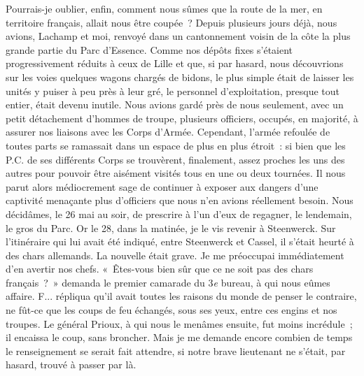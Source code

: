 \documentclass[french,twoside]{book} %
\begin{document}
Pourrais-je oublier, enfin, comment nous sûmes que la route de la mer, en territoire français, allait nous être coupée ? Depuis plusieurs jours déjà, nous avions, Lachamp et moi, renvoyé dans un cantonnement voisin de la côte la plus grande partie du Parc d’Essence. Comme nos dépôts fixes s’étaient progressivement réduits à ceux de Lille et que, si par hasard, nous découvrions sur les voies quelques wagons chargés de bidons, le plus simple était de laisser les unités y puiser à peu près à leur gré, le personnel d’exploitation, presque tout entier, était devenu inutile. Nous avions gardé près de nous seulement, avec un petit détachement d’hommes de troupe, plusieurs officiers, occupés, en majorité, à assurer nos liaisons avec les Corps d’Armée. Cependant, l’armée refoulée de toutes parts se ramassait dans un espace de plus en plus étroit : si bien que les P.C. de ses différents Corps se trouvèrent, finalement, assez proches les uns des autres pour pouvoir être aisément visités tous en une ou deux tournées. Il nous parut alors médiocrement sage de continuer à exposer aux dangers d’une captivité menaçante plus d’officiers que nous n’en avions réellement besoin. Nous décidâmes, le 26 mai au soir, de prescrire à l’un d’eux de regagner, le lendemain, le gros du Parc. Or le 28, dans la matinée, je le vis revenir à Steenwerck. Sur l’itinéraire qui lui avait été indiqué, entre Steenwerck et Cassel, il s’était heurté à des chars allemands. La nouvelle était grave. Je me préoccupai immédiatement d’en avertir nos chefs. « Êtes-vous bien sûr que ce ne soit pas des chars français ? » demanda le premier camarade du 3\emph{e} bureau, à qui   nous eûmes affaire. F... répliqua qu’il avait toutes les raisons du monde de penser le contraire, ne fût-ce que les coups de feu échangés, sous ses yeux, entre ces engins et nos troupes. Le général Prioux, à qui nous le menâmes ensuite, fut moins incrédule ; il encaissa le coup, sans broncher. Mais je me demande encore combien de temps le renseignement se serait fait attendre, si notre brave lieutenant ne s’était, par hasard, trouvé à passer par là.\par
\end{document}
